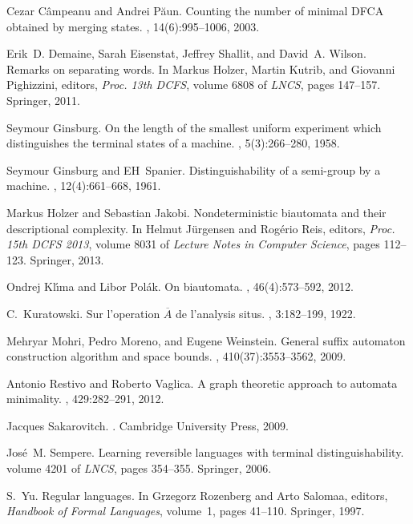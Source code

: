 \documentclass{article}
\begin{document}
\begin{thebibliography}{BBMR14}
Cezar C\^ampeanu and Andrei P\u{a}un.
\newblock Counting the number of minimal {DFCA} obtained by merging states.
, 14(6):995--1006, 2003.

Erik~D. Demaine, Sarah Eisenstat, Jeffrey Shallit, and David~A. Wilson.
\newblock Remarks on separating words.
\newblock In Markus Holzer, Martin Kutrib, and Giovanni Pighizzini, editors,
  {\em Proc. 13th DCFS}, volume 6808 of {\em LNCS}, pages 147--157. Springer,
  2011.

Seymour Ginsburg.
\newblock On the length of the smallest uniform experiment which distinguishes
  the terminal states of a machine.
, 5(3):266--280, 1958.

Seymour Ginsburg and EH~Spanier.
\newblock Distinguishability of a semi-group by a machine.
,
  12(4):661--668, 1961.

Markus Holzer and Sebastian Jakobi.
\newblock Nondeterministic biautomata and their descriptional complexity.
\newblock In Helmut J{\"{u}}rgensen and Rog{\'{e}}rio Reis, editors, {\em Proc.
  15th {DCFS} 2013}, volume 8031 of {\em Lecture Notes in Computer Science},
  pages 112--123. Springer, 2013.

Ondrej Kl{\'{\i}}ma and Libor Pol{\'{a}}k.
\newblock On biautomata.
, 46(4):573--592, 2012.

C.~Kuratowski.
\newblock Sur l’operation $\overline{A}$ de l’analysis situs.
, 3:182--199, 1922.

Mehryar Mohri, Pedro Moreno, and Eugene Weinstein.
\newblock General suffix automaton construction algorithm and space bounds.
, 410(37):3553--3562, 2009.

Antonio Restivo and Roberto Vaglica.
\newblock A graph theoretic approach to automata minimality.
, 429:282--291, 2012.

Jacques Sakarovitch.
.
\newblock Cambridge University Press, 2009.

Jos{\'e}~M. Sempere.
\newblock Learning reversible languages with terminal distinguishability.
\newblock volume 4201 of {\em LNCS}, pages 354--355. Springer, 2006.

S.~Yu.
\newblock Regular languages.
\newblock In Grzegorz Rozenberg and Arto Salomaa, editors, {\em Handbook of
  {F}ormal {L}anguages}, volume~1, pages 41--110. Springer, 1997.

\end{thebibliography}
\end{document}
